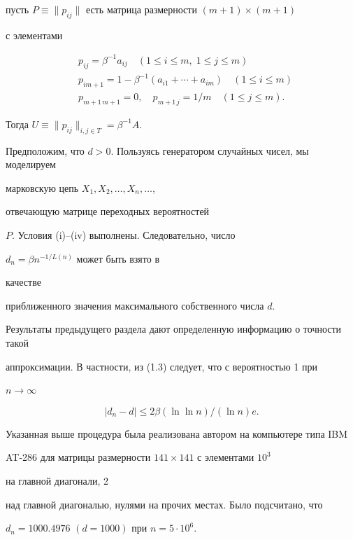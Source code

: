 пусть $P\equiv\|p_{ij}\|$ есть матрица размерности $(m+1)\times(m+1)$ 


с элементами 


\begin{align*} 


& p_{ij}=\beta^{-1}a_{ij}\quad (1\le i\le m,\;1\le j\le m)\\ 


& p_{im+1}=1-\beta^{-1}(a_{i1}+\dotsb+a_{im})\quad (1\le i\le m)\\ 


& p_{m+1\,m+1}=0,\quad p_{m+1\,j}=1/m\quad (1\le j\le m). 


\end{align*} 


Тогда $U\equiv\|p_{ij}\|_{i,j\in T}=\beta^{-1}A$. 


 


Предположим, что $d>0$. Пользуясь генератором случайных чисел, мы моделируем 


марковскую цепь $X_1,X_2,\dotsc,X_n,\dotsc$, 


отвечающую матрице переходных вероятностей 


$P$. Условия (i)--(iv) выполнены. Следовательно, число 


$d_n=\beta n^{-1/L(n)}$ может быть взято в 


качестве 


приближенного значения максимального собственного числа $d$. 


 


Результаты предыдущего раздела дают определенную информацию о точности такой 


аппроксимации. В частности, из (1.3) следует, что с вероятностью 1 при 


$n\to\infty$ 


$$ 


|d_n-d|\le 2\beta(\ln\ln n)/(\ln n)e. 


$$ 


Указанная выше процедура была реализована автором на компьютере типа IBM 


AT-286 для матрицы размерности $141\times141$ с элементами $10^3$ 


на главной диагонали, 2 


над главной диагональю, нулями на прочих местах. Было подсчитано, что 


$d_n=1000.4976$ $(d=1000)$ при $n=5\cdot 10^6$. 


